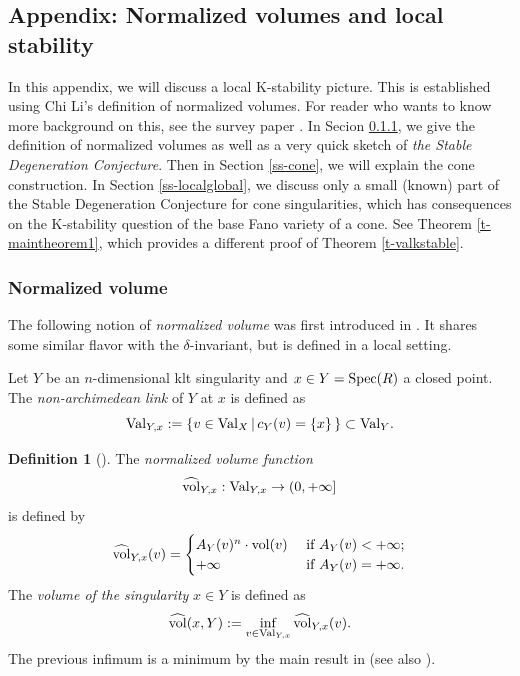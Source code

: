 \documentclass[12pt,reqno]{amsart}%
\theoremstyle{definition}
\newtheorem{defn}[thm]{Definition}
\theoremstyle{remark}
\newcommand{\Val}{{\rm Val}}
\newcommand{\vol}{{\rm vol}}
\newcommand{\hvol}{\widehat{\rm vol}}
\begin{document}
\begin{subappendices}



\subsection{Appendix: Normalized volumes and local stability}\label{s-local}

In this appendix, we will discuss a local K-stability picture. This is established using Chi Li's definition of normalized volumes. For reader who wants to know more background on this, see the survey paper \cite{LLX18}. In Secion \ref{ss-normv}, we give the definition of normalized volumes as well as a very quick sketch of {\it the Stable Degeneration Conjecture}. Then in Section \ref{ss-cone}, we will explain the cone construction. In Section \ref{ss-localglobal},  we discuss only a small (known) part of the Stable Degeneration Conjecture for cone singularities, which has consequences on the K-stability question of the base Fano variety of a cone. See Theorem \ref{t-maintheorem1}, which provides a different proof of Theorem \ref{t-valkstable}.

\subsubsection{Normalized volume}\label{ss-normv}
The following notion of {\it normalized volume} was first introduced in \cite{Li18}. It shares some similar flavor with the $\delta$-invariant, but is defined in a local setting. 


Let $Y$ be an $n$-dimensional klt singularity and $x\in Y={\rm Spec}(R)$ a closed point. The {\it non-archimedean link} of $Y$ at $x$ is defined  as
$$\Val_{Y,x} := \{ v\in \Val_{X} \, \vert\, c_Y(v) = \{x \} \, \} \subset \Val_Y.$$




\begin{defn}[\cite{Li18}]\label{d-normvol}
The \emph{normalized volume function} $$\hvol_{Y,x}:\Val_{Y,x}\to(0, +\infty]$$
 is defined by
  \[
  \hvol_{Y, x}(v)=\begin{cases}
            A_{Y}(v)^n\cdot\vol(v) & \textrm{ if }A_{Y}(v)<+\infty;\\
            +\infty & \textrm{ if }A_{Y}(v)=+\infty.
           \end{cases}
 \]
 The \emph{volume of the singularity} $x\in Y$ is defined as
 \[
  \hvol(x, Y):=\inf_{v\in\Val_{Y,x}}\hvol_{Y,x}(v).
 \]
 The previous infimum is a minimum by the main result in \cite{Blu18} (see also \cite[Remark 3.8]{Xu19}).
 \end{defn}


\end{subappendices}
\end{document}
